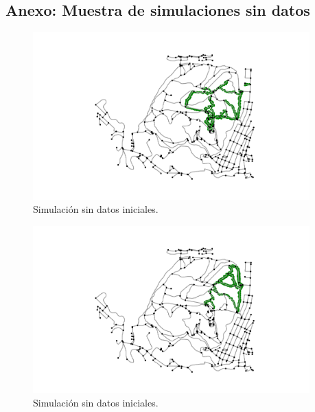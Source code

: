 \subsection{Anexo: Muestra de simulaciones sin datos} \label{subseciton:SimulationSample}\begin{figure}[h]
\begin{center}
\includegraphics[width=0.95\textwidth]{./Imagenes/empty-simulation/track1.png}
\caption{Simulación sin datos iniciales.}
\end{center}
\label{figure:Simulation1}
\end{figure}

\begin{figure}[h]
\begin{center}
\includegraphics[width=0.95\textwidth]{./Imagenes/empty-simulation/track2.png}
\caption{Simulación sin datos iniciales.}
\end{center}
\label{figure:Simulation2}
\end{figure}

